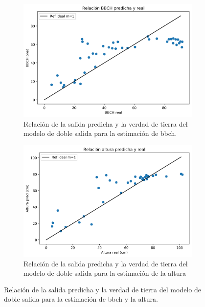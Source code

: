 \begin{figure}[H]
\centering
\begin{subfigure}{\textwidth}
  \centering
  \includegraphics[width=0.95\linewidth]{archivos/tfg/Pixel/BBCHH_RELACION_BIEN_b}
  \caption{Relación de la salida predicha y la verdad de tierra del modelo de doble salida para la estimación de \gls{bbch}. \label{fig:p_rel_bh_b}}
\end{subfigure}
\begin{subfigure}{\textwidth}
  \centering
  \includegraphics[width=0.95\linewidth]{archivos/tfg/Pixel/BBCHH_RELACION_BIEN_H}
  \caption{Relación de la salida predicha y la verdad de tierra del modelo de doble salida para la estimación de la altura\label{fig:p_rel_bh_h}}
\end{subfigure}
\caption{Relación de la salida predicha y la verdad de tierra del modelo de doble salida para la estimación de \gls{bbch} y la altura. \label{fig:p_rel_bh}}
\end{figure}

